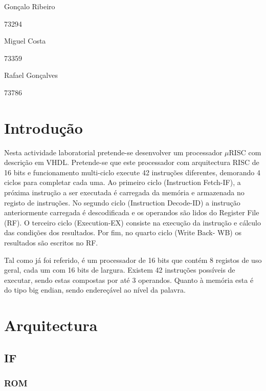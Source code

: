 \documentclass[a4paper]{article}
\begin{document}
	
	
	
	\trSetAuthors
		{
		Gonçalo Ribeiro
		
		73294
		}{
		Miguel Costa
		
		73359
		}{
		Rafael Gonçalves
		
		73786
		}
	
	
	\trMakeCover
	
	\tableofcontents
	\pagebreak
	
	\section{Introdução}
	
		Nesta actividade laboratorial pretende-se desenvolver um processador $\mu$RISC com descrição em VHDL. Pretende-se que este processador com arquitectura RISC de 16 bits e funcionamento multi-ciclo execute 42 instruções diferentes, demorando 4 ciclos para completar cada uma. Ao primeiro ciclo (Instruction Fetch-IF), a próxima instrução a ser executada é carregada da memória e armazenada no registo de instruções. No segundo ciclo (Instruction Decode-ID) a instrução anteriormente carregada é descodificada e os operandos são lidos do Register File (RF). O terceiro ciclo (Execution-EX) consiste na execução da instrução e cálculo das condições dos resultados. Por fim, no quarto ciclo (Write Back- WB) os resultados são escritos no RF.
	
		Tal como já foi referido, é um processador de 16 bits que contém 8 registos de uso geral, cada um com 16 bits de largura. Existem 42 instruções possíveis de executar, sendo estas compostas por até 3 operandos. Quanto à memória esta é do tipo big endian, sendo endereçável ao nível da palavra.
	
	
	\section{Arquitectura}
	
		\subsection{IF}
		
			\subsubsection{ROM}
			
\end{document}
